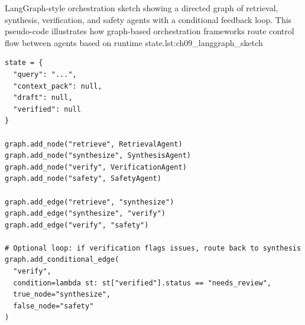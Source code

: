 \begin{codebox}{LangGraph-style orchestration sketch showing a directed graph of retrieval, synthesis, verification, and safety agents with a conditional feedback loop. This pseudo-code illustrates how graph-based orchestration frameworks route control flow between agents based on runtime state.}{lst:ch09_langgraph_sketch}
\begin{verbatim}
state = {
  "query": "...",
  "context_pack": null,
  "draft": null,
  "verified": null
}

graph.add_node("retrieve", RetrievalAgent)
graph.add_node("synthesize", SynthesisAgent)
graph.add_node("verify", VerificationAgent)
graph.add_node("safety", SafetyAgent)

graph.add_edge("retrieve", "synthesize")
graph.add_edge("synthesize", "verify")
graph.add_edge("verify", "safety")

# Optional loop: if verification flags issues, route back to synthesis
graph.add_conditional_edge(
  "verify",
  condition=lambda st: st["verified"].status == "needs_review",
  true_node="synthesize",
  false_node="safety"
)
\end{verbatim}
\end{codebox}

